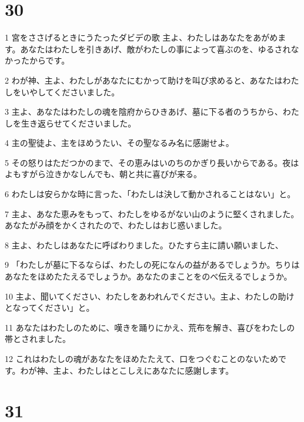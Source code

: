 \chapter{30}

\par 1 宮をささげるときにうたったダビデの歌 主よ、わたしはあなたをあがめます。あなたはわたしを引きあげ、敵がわたしの事によって喜ぶのを、ゆるされなかったからです。
\par 2 わが神、主よ、わたしがあなたにむかって助けを叫び求めると、あなたはわたしをいやしてくださいました。
\par 3 主よ、あなたはわたしの魂を陰府からひきあげ、墓に下る者のうちから、わたしを生き返らせてくださいました。
\par 4 主の聖徒よ、主をほめうたい、その聖なるみ名に感謝せよ。
\par 5 その怒りはただつかのまで、その恵みはいのちのかぎり長いからである。夜はよもすがら泣きかなしんでも、朝と共に喜びが来る。
\par 6 わたしは安らかな時に言った、「わたしは決して動かされることはない」と。
\par 7 主よ、あなた恵みをもって、わたしをゆるがない山のように堅くされました。あなたがみ顔をかくされたので、わたしはおじ惑いました。
\par 8 主よ、わたしはあなたに呼ばわりました。ひたすら主に請い願いました、
\par 9 「わたしが墓に下るならば、わたしの死になんの益があるでしょうか。ちりはあなたをほめたたえるでしょうか。あなたのまことをのべ伝えるでしょうか。
\par 10 主よ、聞いてください、わたしをあわれんでください。主よ、わたしの助けとなってください」と。
\par 11 あなたはわたしのために、嘆きを踊りにかえ、荒布を解き、喜びをわたしの帯とされました。
\par 12 これはわたしの魂があなたをほめたたえて、口をつぐむことのないためです。わが神、主よ、わたしはとこしえにあなたに感謝します。

\chapter{31}


